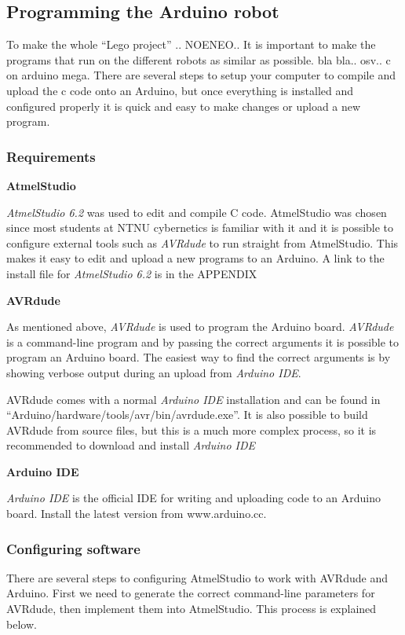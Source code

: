 \subsection{Programming the Arduino robot}
To make the whole ``Lego project'' .. NOENEO.. It is important to make the programs that run on the different robots as similar as possible. bla bla..  osv.. c on arduino mega. There are several steps to setup your computer to compile and upload the c code onto an Arduino, but once everything is installed and configured properly it is quick and easy to make changes or upload a new program.

\subsubsection{Requirements}
\textbf{AtmelStudio}

\textit{AtmelStudio 6.2} was used to edit and compile C code. AtmelStudio was chosen since most students at NTNU cybernetics is familiar with it and it is possible to configure external tools such as \textit{AVRdude} to run straight from AtmelStudio. This makes it easy to edit and upload a new programs to an Arduino. A link to the install file for \textit{AtmelStudio 6.2} is in the APPENDIX

\textbf{AVRdude}

As mentioned above, \textit{AVRdude} is used to program the Arduino board. \textit{AVRdude} is a command-line program and by passing the correct arguments it is possible to program an Arduino board. The easiest way to find the correct arguments is by showing verbose output during an upload from \textit{Arduino IDE}.

AVRdude comes with a normal \textit{Arduino IDE} installation and can be found in ``Arduino/hardware/tools/avr/bin/avrdude.exe''. It is also possible to build AVRdude from source files, but this is a much more complex process, so it is recommended to download and install \textit{Arduino IDE}

\textbf{Arduino IDE}

\textit{Arduino IDE} is the official IDE for writing and uploading code to an Arduino board. Install the latest version from www.arduino.cc.

\subsubsection{Configuring software}
There are several steps to configuring AtmelStudio to work with AVRdude and Arduino. First we need to generate the correct command-line parameters for AVRdude, then implement them into AtmelStudio. This process is explained below.

